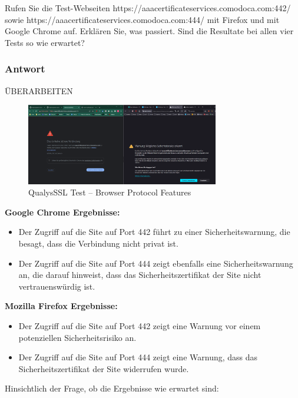 \documentclass{article}
\begin{document}
Rufen Sie die Test-Webseiten https://aaacertificateservices.comodoca.com:442/ sowie 
https://aaacertificateservices.comodoca.com:444/  mit Firefox und mit Google 
Chrome auf. Erklären Sie, was passiert. Sind die Resultate bei allen vier Tests so 
wie erwartet?

\subsubsection*{Antwort}

ÜBERARBEITEN

\begin{figure}[H]
	\includegraphics[width=0.75\textwidth]{images/05}
	\centering
	\caption{QualysSSL Test – Browser Protocol Features}
\end{figure}

\textbf{Google Chrome Ergebnisse:}

\begin{itemize}
    \item Der Zugriff auf die Site auf Port 442 führt zu einer Sicherheitswarnung,
		die besagt, dass die Verbindung nicht privat ist.
	\item Der Zugriff auf die Site auf Port 444 zeigt ebenfalls eine Sicherheitswarnung an,
		die darauf hinweist, dass das Sicherheitszertifikat der Site nicht vertrauenswürdig ist.
\end{itemize}

\textbf{Mozilla Firefox Ergebnisse:}

\begin{itemize}
	\item Der Zugriff auf die Site auf Port 442 zeigt eine Warnung vor einem potenziellen Sicherheitsrisiko an.
	\item Der Zugriff auf die Site auf Port 444 zeigt eine Warnung, dass das Sicherheitszertifikat der Site widerrufen wurde.
\end{itemize}

Hinsichtlich der Frage, ob die Ergebnisse wie erwartet sind:
\end{document}
